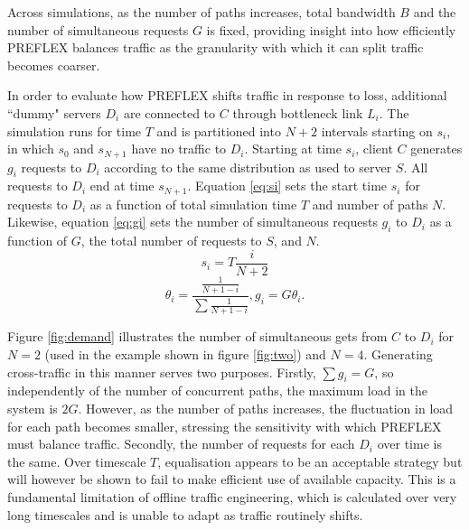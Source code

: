 Across simulations, as the number of paths increases, total bandwidth $B$ and the number of simultaneous requests $G$ is fixed, providing insight into how efficiently \ac{PREFLEX} balances traffic as the granularity with which it can split traffic becomes coarser.

In order to evaluate how \ac{PREFLEX} shifts traffic in response to loss, additional ``dummy" servers $D_i$ are connected to $C$ through bottleneck link $L_i$.
The simulation runs for time $T$ and is partitioned into $N+2$ intervals starting on $s_i$, in which $s_0$ and $s_{N+1}$ have no traffic to $D_i$. 
Starting at time $s_i$, client $C$ generates $g_i$ requests to $D_i$ according to the same distribution as used to server $S$. 
All requests to $D_i$ end at time $s_{N+1}$. 
Equation \eqref{eq:si} sets the start time $s_i$ for requests to $D_i$ as a function of total simulation time $T$ and number of paths $N$. 
Likewise, equation \eqref{eq:gi} sets the number of simultaneous requests $g_i$ to $D_i$ as a function of $G$, the total number of requests to $S$, and $N$.
\begin{equation}
s_i = T\frac{i}{N+2}
\label{eq:si}
\end{equation}
\begin{equation}
\theta_i = \frac{\frac{1}{N+1-i}}{\sum{\frac{1}{N+1-i}}},  g_i = G\theta_i.
\label{eq:gi}
\end{equation}

Figure \ref{fig:demand} illustrates the number of simultaneous gets from $C$ to $D_i$ for $N=2$ (used in the example shown in figure \ref{fig:two}) and $N=4$. 
Generating cross-traffic in this manner serves two purposes. 
Firstly, $\sum{g_i}=G$, so independently of the number of concurrent paths, the maximum load in the system is $2G$. 
However, as the number of paths increases, the fluctuation in load for each path becomes smaller, stressing the sensitivity with which \ac{PREFLEX} must balance traffic. 
Secondly, the number of requests for each $D_i$ over time is the same. 
Over timescale $T$, equalisation appears to be an acceptable strategy but will however be shown to fail to make efficient use of available capacity. 
This is a fundamental limitation of offline traffic engineering, which is calculated over very long timescales and is unable to adapt as traffic routinely shifts.

